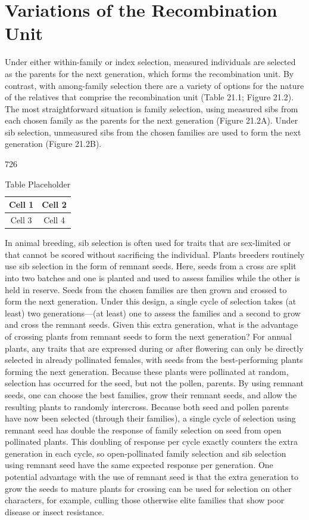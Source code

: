 \documentclass{article}
\begin{document}
\section{Variations of the Recombination Unit}
Under either within-family or index selection, measured individuals are selected as the parents for the next generation, which forms the recombination unit. By contrast, with among-family selection there are a variety of options for the nature of the relatives that comprise the recombination unit (Table 21.1; Figure 21.2). The most straightforward situation is family selection, using measured sibs from each chosen family as the parents for the next generation (Figure 21.2A). Under sib selection, unmeasured sibs from the chosen families are used to form the next generation (Figure 21.2B).

726

\begin{table}[h]
\centering
\begin{tabular}{|c|c|}
\hline
Cell 1 & Cell 2 \\
\hline
Cell 3 & Cell 4 \\
\hline
\end{tabular}
\caption{Table Placeholder}
\end{table}

In animal breeding, sib selection is often used for traits that are sex-limited or that cannot be scored without sacrificing the individual. Plants breeders routinely use sib selection in the form of remnant seeds. Here, seeds from a cross are split into two batches and one is planted and used to assess families while the other is held in reserve. Seeds from the chosen families are then grown and crossed to form the next generation. Under this design, a single cycle of selection takes (at least) two generations—(at least) one to assess the families and a second to grow and cross the remnant seeds. Given this extra generation, what is the advantage of crossing plants from remnant seeds to form the next generation? For annual plants, any traits that are expressed during or after flowering can only be directly selected in already pollinated females, with seeds from the best-performing plants forming the next generation. Because these plants were pollinated at random, selection has occurred for the seed, but not the pollen, parents. By using remnant seeds, one can choose the best families, grow their remnant seeds, and allow the resulting plants to randomly intercross. Because both seed and pollen parents have now been selected (through their families), a single cycle of selection using remnant seed has double the response of family selection on seed from open pollinated plants. This doubling of response per cycle exactly counters the extra generation in each cycle, so open-pollinated family selection and sib selection using remnant seed have the same expected response per generation. One potential advantage with the use of remnant seed is that the extra generation to grow the seeds to mature plants for crossing can be used for selection on other characters, for example, culling those otherwise elite families that show poor disease or insect resistance.
\end{document}

